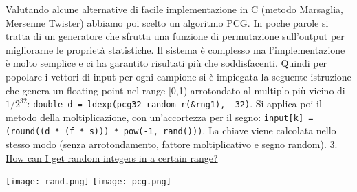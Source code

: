 \documentclass{article}
\begin{document}
\newline
\newline
Valutando alcune alternative di facile implementazione in C (metodo Marsaglia, Mersenne Twister) abbiamo poi scelto un algoritmo \href{https://www.pcg-random.org/}{PCG}. In poche parole si tratta di un generatore che sfrutta una funzione di permutazione sull'output per migliorarne le proprietà statistiche. Il sistema è complesso ma l'implementazione è molto semplice e ci ha garantito risultati più che soddisfacenti.
\newline
\newline
Quindi per popolare i vettori di input per ogni campione si è impiegata la seguente istruzione che genera un floating point nel range [0,1) arrotondato al multiplo più vicino di $1/2^{32}$:
\newline
\texttt{double d = ldexp(pcg32_random_r(&rng1), -32)}.
\newline
\newline
Si applica poi il metodo della moltiplicazione, con un'accortezza per il segno:
\newline
\texttt{input[k] = (round((d * (f * s))) * pow(-1, rand()))}.
\newline
\newline
La chiave viene calcolata nello stesso modo (senza arrotondamento, fattore moltiplicativo e segno random).
\newline
\newline
\newline
\href{https://c-faq.com/lib/randrange.html}{3. How can I get random integers in a certain range?}

\newpage
\begin{center}
\texttt{[image: rand.png]}
\texttt{[image: pcg.png]}
\end{center}

\newpage
\end{document}
